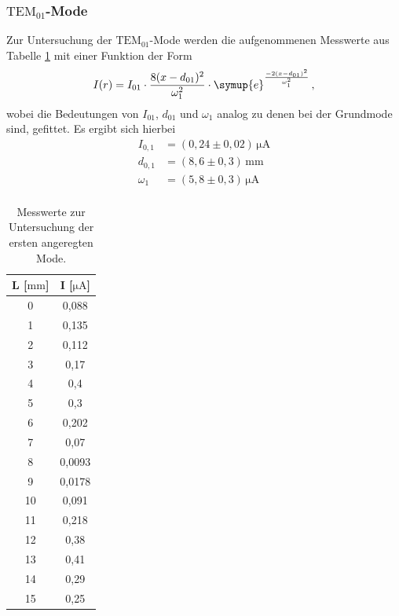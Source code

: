 \subsubsection{$\text{TEM}_{01}$-Mode}
Zur Untersuchung der $\text{TEM}_{01}$-Mode werden die aufgenommenen Messwerte aus Tabelle \ref{mode2} mit einer Funktion der Form
\begin{equation}
  I(r)=I_{01}\cdot\frac{8(x-d_{01})^2}{\omega_1^2}\cdot\symup{e}^{\frac{-2(x-d_{01})^2}{\omega_1^2}} \, ,
\end{equation}
wobei die Bedeutungen von $I_{01}$, $d_{01}$ und $\omega_1$ analog zu denen bei der Grundmode sind, gefittet.
Es ergibt sich hierbei
\begin{align}
  I_{0,1} &=(0,24 \pm 0,02)\, \si{\micro\ampere}\\
  d_{0,1} &=(8,6 \pm 0,3)\, \si{\milli\meter}\\
 \omega_1 &=(5,8 \pm 0,3)\,  \si{\micro\ampere}\\
\end{align}
\begin{table}[]
  \centering
\begin{tabular}{c|c}
L [$ \si{\milli\meter}$]   &   I [$ \si{\micro\ampere}$]     \\
  \hline
0  & 0,088  \\
1  & 0,135  \\
2  & 0,112  \\
3  & 0,17   \\
4  & 0,4    \\
5  & 0,3    \\
6  & 0,202  \\
7  & 0,07   \\
8  & 0,0093 \\
9  & 0,0178 \\
10 & 0,091  \\
11 & 0,218  \\
12 & 0,38   \\
13 & 0,41   \\
14 & 0,29   \\
15 & 0,25
\end{tabular}
\caption{Messwerte zur Untersuchung der ersten angeregten Mode.}
\label{mode2}
\end{table}
